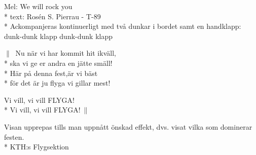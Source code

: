 \begin{SongText}
    \begin{SongInfo}
        Mel: We will rock you\\*%
        text: Rosén S. Pierrau - T-89\\*%
        Ackompanjeras kontinuerligt med två dunkar i bordet samt en handklapp: dunk-dunk klapp dunk-dunk klapp
    \end{SongInfo}
    \begin{SongVerse}
        $\|\:$ Nu när vi har kommit hit ikväll,\\*%
        ska vi ge er andra en jätte smäll!\\*%
        Här på denna fest,är vi bäst\\*%
        för det är ju flyga vi gillar mest! 
    \end{SongVerse}
    \begin{SongVerse}
        Vi vill, vi vill FLYGA!\\*%
        Vi vill, vi vill FLYGA!$\:\|$
    \end{SongVerse}
    \begin{SongInfo}
        Visan upprepas tills man uppnått önskad effekt, dvs. visat vilka som dominerar festen.\\*%
        KTH:s Flygsektion
    \end{SongInfo}
\end{SongText}
